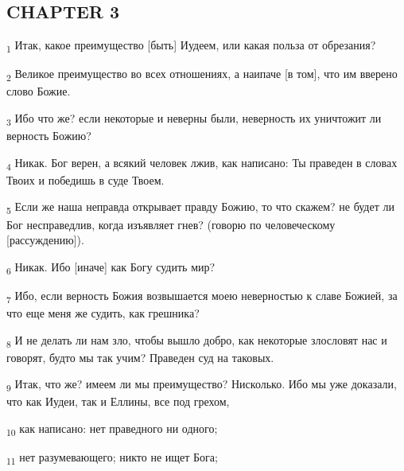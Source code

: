 \subsection{CHAPTER 3}
\begin{tcolorbox}
\textsubscript{1} Итак, какое преимущество [быть] Иудеем, или какая польза от обрезания?
\end{tcolorbox}
\begin{tcolorbox}
\textsubscript{2} Великое преимущество во всех отношениях, а наипаче [в том], что им вверено слово Божие.
\end{tcolorbox}
\begin{tcolorbox}
\textsubscript{3} Ибо что же? если некоторые и неверны были, неверность их уничтожит ли верность Божию?
\end{tcolorbox}
\begin{tcolorbox}
\textsubscript{4} Никак. Бог верен, а всякий человек лжив, как написано: Ты праведен в словах Твоих и победишь в суде Твоем.
\end{tcolorbox}
\begin{tcolorbox}
\textsubscript{5} Если же наша неправда открывает правду Божию, то что скажем? не будет ли Бог несправедлив, когда изъявляет гнев? (говорю по человеческому [рассуждению]).
\end{tcolorbox}
\begin{tcolorbox}
\textsubscript{6} Никак. Ибо [иначе] как Богу судить мир?
\end{tcolorbox}
\begin{tcolorbox}
\textsubscript{7} Ибо, если верность Божия возвышается моею неверностью к славе Божией, за что еще меня же судить, как грешника?
\end{tcolorbox}
\begin{tcolorbox}
\textsubscript{8} И не делать ли нам зло, чтобы вышло добро, как некоторые злословят нас и говорят, будто мы так учим? Праведен суд на таковых.
\end{tcolorbox}
\begin{tcolorbox}
\textsubscript{9} Итак, что же? имеем ли мы преимущество? Нисколько. Ибо мы уже доказали, что как Иудеи, так и Еллины, все под грехом,
\end{tcolorbox}
\begin{tcolorbox}
\textsubscript{10} как написано: нет праведного ни одного;
\end{tcolorbox}
\begin{tcolorbox}
\textsubscript{11} нет разумевающего; никто не ищет Бога;
\end{tcolorbox}
